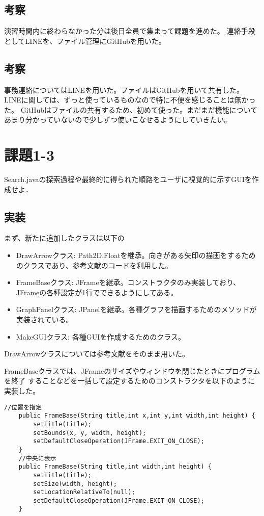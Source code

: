 \documentclass{jarticle}
\begin{document}
\subsection{考察}
  演習時間内に終わらなかった分は後日全員で集まって課題を進めた。
  連絡手段としてLINEを、ファイル管理にGitHubを用いた。
\subsection{考察}
  事務連絡についてはLINEを用いた。ファイルはGitHubを用いて共有した。
  LINEに関しては、ずっと使っているものなので特に不便を感じることは無かった。
  GitHubはファイルの共有するため、初めて使った。まだまだ機能についてあまり分かっていないので少しずつ使いこなせるようにしていきたい。

\section{課題1-3}
\begin{screen}
  Search.javaの探索過程や最終的に得られた順路をユーザに視覚的に示すGUIを作成せよ．
\end{screen}
\subsection{実装}
まず、新たに追加したクラスは以下の
\begin{itemize}
  \item DrawArrowクラス: Path2D.Floatを継承。向きがある矢印の描画をするためのクラスであり、参考文献のコードを利用した。
  \item FrameBaseクラス: JFrameを継承。コンストラクタのみ実装しており、JFrameの各種設定が1行でできるようにしてある。
  \item GraphPanelクラス: JPanelを継承。各種グラフを描画するためのメソッドが実装されている。
  \item MakeGUIクラス: 各種GUIを作成するためのクラス。
\end{itemize}

DrawArrowクラスについては参考文献\cite{goo}をそのまま用いた。

FrameBaseクラスでは、JFrameのサイズやウィンドウを閉じたときにプログラムを終了
することなどを一括して設定するためのコンストラクタを以下のように実装した。

\begin{lstlisting}[caption=FrameBaseのコンストラクタ,label=src:FrameBase]
	//位置を指定
    public FrameBase(String title,int x,int y,int width,int height) {
		setTitle(title);
		setBounds(x, y, width, height);
		setDefaultCloseOperation(JFrame.EXIT_ON_CLOSE);
	}
	//中央に表示
	public FrameBase(String title,int width,int height) {
		setTitle(title);
		setSize(width, height);
		setLocationRelativeTo(null);
		setDefaultCloseOperation(JFrame.EXIT_ON_CLOSE);
	}
\end{lstlisting}
\end{document}
